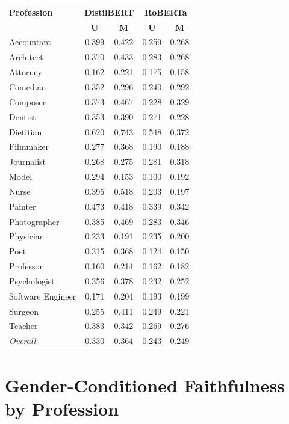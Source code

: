\documentclass[11pt]{article}
\begin{document}
\begin{center}\small
\begin{tabular}{lcccc}
\toprule
\textbf{Profession} & \multicolumn{2}{c}{\textbf{DistilBERT}} & \multicolumn{2}{c}{\textbf{RoBERTa}} \\
& \textbf{U} & \textbf{M} & \textbf{U} & \textbf{M} \\
\midrule
Accountant        & 0.399 & 0.422 & 0.259 & 0.268 \\
Architect         & 0.370 & 0.433 & 0.283 & 0.268 \\
Attorney          & 0.162 & 0.221 & 0.175 & 0.158 \\
Comedian          & 0.352 & 0.296 & 0.240 & 0.292 \\
Composer          & 0.373 & 0.467 & 0.228 & 0.329 \\
Dentist           & 0.353 & 0.390 & 0.271 & 0.228 \\
Dietitian         & 0.620 & 0.743 & 0.548 & 0.372 \\
Filmmaker         & 0.277 & 0.368 & 0.190 & 0.188 \\
Journalist        & 0.268 & 0.275 & 0.281 & 0.318 \\
Model             & 0.294 & 0.153 & 0.100 & 0.192 \\
Nurse             & 0.395 & 0.518 & 0.203 & 0.197 \\
Painter           & 0.473 & 0.418 & 0.339 & 0.342 \\
Photographer      & 0.385 & 0.469 & 0.283 & 0.346 \\
Physician         & 0.233 & 0.191 & 0.235 & 0.200 \\
Poet              & 0.315 & 0.368 & 0.124 & 0.150 \\
Professor         & 0.160 & 0.214 & 0.162 & 0.182 \\
Psychologist      & 0.356 & 0.378 & 0.232 & 0.252 \\
Software Engineer & 0.171 & 0.204 & 0.193 & 0.199 \\
Surgeon           & 0.255 & 0.411 & 0.249 & 0.221 \\
Teacher           & 0.383 & 0.342 & 0.269 & 0.276 \\
\midrule
\textit{Overall}  & 0.330 & 0.364 & 0.243 & 0.249 \\
\bottomrule
\end{tabular}
\end{center}

\section{Gender-Conditioned Faithfulness by Profession}
\end{document}
